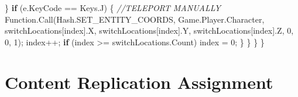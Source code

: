 \documentclass[
  openany]{book}
\newenvironment{Shaded}{\begin{snugshade}}{\end{snugshade}}
\newcommand{\CommentTok}[1]{\textcolor[rgb]{0.56,0.35,0.01}{\textit{#1}}}
\newcommand{\DecValTok}[1]{\textcolor[rgb]{0.00,0.00,0.81}{#1}}
\newcommand{\FunctionTok}[1]{\textcolor[rgb]{0.00,0.00,0.00}{#1}}
\newcommand{\KeywordTok}[1]{\textcolor[rgb]{0.13,0.29,0.53}{\textbf{#1}}}
\newcommand{\NormalTok}[1]{#1}
\begin{document}
\begin{Shaded}
\begin{Highlighting}[]
\NormalTok{           \}}
           \KeywordTok{if}\NormalTok{ (e.}\FunctionTok{KeyCode}\NormalTok{ == Keys.}\FunctionTok{J}\NormalTok{)}
\NormalTok{           \{}
              \CommentTok{//TELEPORT MANUALLY}
\NormalTok{              Function.}\FunctionTok{Call}\NormalTok{(Hash.}\FunctionTok{SET_ENTITY_COORDS}\NormalTok{, Game.}\FunctionTok{Player}\NormalTok{.}\FunctionTok{Character}\NormalTok{, switchLocations[index].}\FunctionTok{X}\NormalTok{, switchLocations[index].}\FunctionTok{Y}\NormalTok{, switchLocations[index].}\FunctionTok{Z}\NormalTok{, }\DecValTok{0}\NormalTok{, }\DecValTok{0}\NormalTok{, }\DecValTok{1}\NormalTok{);}
\NormalTok{              index++;}
              \KeywordTok{if}\NormalTok{ (index >= switchLocations.}\FunctionTok{Count}\NormalTok{) index = }\DecValTok{0}\NormalTok{;}
\NormalTok{            \}}
\NormalTok{        \}}
\NormalTok{    \}}
\NormalTok{\}}


\end{Highlighting}
\end{Shaded}

\hypertarget{content-replication-assignment-6}{%
\section*{Content Replication Assignment}\label{content-replication-assignment-6}}
\end{document}
